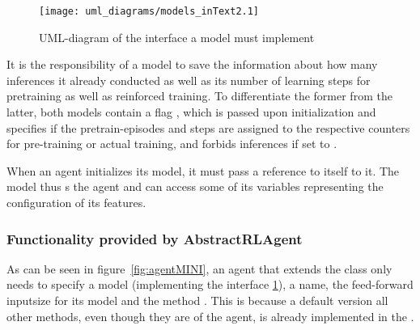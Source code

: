 \begin{figure}[h!]
	\centering 
	\texttt{[image: uml\_diagrams/models\_inText2.1]}
	\caption{UML-diagram of the interface a model must implement}
	\label{fig:modelsInt}
\end{figure}

It is the responsibility of a model to save the information about how many inferences it already conducted as well as its number of learning steps for pretraining as well as reinforced training. To differentiate the former from the latter, both models contain a flag , which is passed upon initialization and specifies if the pretrain-episodes and steps are assigned to the respective counters for pre-training or actual training, and forbids inferences if set to .

When an agent initializes its model, it must pass a reference to itself to it. The model thus s the agent and can access some of its variables representing the configuration of its features.


\subsubsection{Functionality provided by AbstractRLAgent}

As can be seen in figure~\ref{fig:agentMINI}, an agent that extends the class  only needs to specify a model (implementing the interface \ref{fig:modelsInt}), a name, the feed-forward inputsize for its model and the method . This is because a default version all other methods, even though they are  of the agent, is already implemented in the . 

